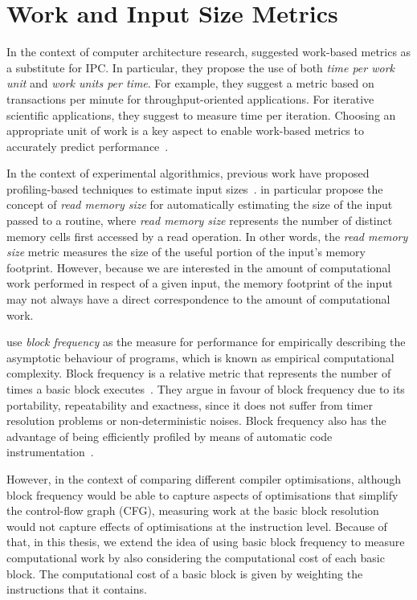 \section{Work and Input Size Metrics}\label{sec:related-metrics}

In the context of computer architecture research, \cite{alameldeen06} suggested work-based metrics as a substitute for IPC.
In particular, they propose the use of both \textit{time per work unit} and \textit{work units per time}.
For example, they suggest a metric based on transactions per minute for throughput-oriented applications.
For iterative scientific applications, they suggest to measure time per iteration.
Choosing an appropriate unit of work is a key aspect to enable work-based metrics to accurately predict performance~\citep{alameldeen06}. 

In the context of experimental algorithmics, previous work have proposed profiling-based techniques to estimate input sizes~\citep{mcgeoch07,zaparanuks12,coppa14}.
\cite{coppa14} in particular propose the concept of \textit{read memory size} for automatically estimating the size of the input passed to a routine, where \textit{read memory size} represents the number of distinct memory cells first accessed by a read operation.
In other words, the \textit{read memory size} metric measures the size of the useful portion of the input's memory footprint.
However, because we are interested in the amount of computational work performed in respect of a given input, the memory footprint of the input may not always have a direct correspondence to  the amount of computational work.

\cite{goldsmith07} use \textit{block frequency} as the measure for performance for empirically describing the asymptotic behaviour of programs, which is known as empirical computational complexity.
Block frequency is a relative metric that represents the number of times a basic block executes~\citep{ball94,ball96}.
They argue in favour of block frequency due to its portability, repeatability and exactness, since it does not suffer from timer resolution problems or non-deterministic noises.
Block frequency also has the advantage of being efficiently profiled by means of automatic code instrumentation~\citep{knuth73,ball94}.

However, in the context of comparing different compiler optimisations, although block frequency would be able to capture aspects of optimisations that simplify the control-flow graph (CFG), measuring work at the basic block resolution would not capture effects of optimisations at the instruction level.
Because of that, in this thesis, we extend the idea of using basic block frequency to measure computational work by also considering the computational cost of each basic block.
The computational cost of a basic block is given by weighting the instructions that it contains.

